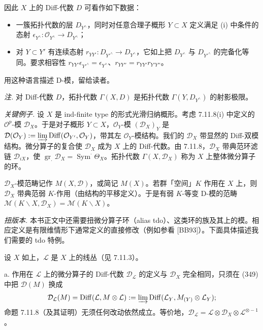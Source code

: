 因此 $X$ 上的 Diff-代数 $D$ 可看作如下数据：
\begin{itemize}[label=--]
\item 一簇拓扑代数的层 $D_{Y^\wedge}$，同时对任意合理子概形 $Y\subset X$ 定义满足 (i) 中条件的态射 $\epsilon_{Y^\wedge}:\mathcal{O}_{Y^\wedge}\to D_{Y^\wedge}$；
\item 对 $Y\subset Y'$ 有连续态射 $r_{YY'}:D_{Y'^\wedge}\to D_{Y^\wedge}$，它如上把 $D_{Y^\wedge}$ 与 $D_{Y'^\wedge}$ 的完备化等同。要求相容性 $r_{YY'}\epsilon_{Y'^\wedge}=\epsilon_{Y^\wedge}$、$r_{YY''}=r_{YY'}r_{Y'Y''}$。
\end{itemize}
用这种语言描述 D-模，留给读者。

\emph{注.} 对 Diff-代数 $D$，拓扑代数 $\Gamma(X,D)$ 是拓扑代数 $\Gamma(Y,D_{Y^\wedge})$ 的射影极限。

 \emph{关键例子.} 设 $X$ 是 ind-finite type 的形式光滑归纳概形。考虑 7.11.8(i) 中定义的 $\mathcal{O}^p$-模 $\mathcal{D}_X$。于是对子概形 $Y\subset X$，$\mathcal{O}_Y$-模 $(\mathcal{D}_X)_Y$ 是 $\mathcal{D}(\mathcal{O}_Y):=\varinjlim\operatorname{Diff}(\mathcal{O}_{Y'},\mathcal{O}_Y)$，带其左 $\mathcal{O}_Y$-模结构。我们的 $\mathcal{D}_X$ 带显然的 Diff-双模结构。微分算子的复合使 $\mathcal{D}_X$ 成为 $X$ 上的 Diff-代数。由 7.11.8，$\mathcal{D}_X$ 带典范环滤链 $\mathcal{D}_{iX}$，使 $\operatorname{gr}_\cdot\mathcal{D}_X=\operatorname{Sym}^\cdot\Theta_X$。拓扑代数 $\Gamma(X,\mathcal{D}_X)$ 称为 $X$ 上整体微分算子的环。

$\mathcal{D}_X$-模范畴记作 $M(X,\mathcal{D})$，或简记 $M(X)$。若群「空间」$K$ 作用在 $X$ 上，则 $\mathcal{D}_X$ 带典范弱 $K$-作用（由结构的平移定义）。于是有弱 $K$-等变 D-模的范畴 $\mathcal{M}(K\backslash X,\mathcal{D}_X)=\mathcal{M}(K\backslash X)$。

\emph{扭版本.} 本书正文中还需要扭微分算子环（alias tdo）、这类环的族及其上的模。相应定义是有限维情形下通常定义的直接修改（例如参看 [BB93]）。下面具体描述我们需要的 tdo 特例。

设 $X$ 如上，$\mathcal{L}$ 是 $X$ 上的线丛（见 7.11.3）。

a. 作用在 $\mathcal{L}$ 上的微分算子的 Diff-代数 $\mathcal{D}_{\mathcal{L}}$ 的定义与 $\mathcal{D}_X$ 完全相同，只须在 (349) 中把 $\mathcal{D}(M)$ 换成
\[
\mathcal{D}_{\mathcal{L}}(M)=\operatorname{Diff}(\mathcal{L},M\otimes\mathcal{L}):=\varinjlim\operatorname{Diff}(\mathcal{L}_Y,M_{(Y)}\otimes\mathcal{L}_Y);
\]
命题 7.11.8（及其证明）无须任何改动依然成立。等价地，$\mathcal{D}_{\mathcal{L}}=\mathcal{L}\otimes\mathcal{D}_X\otimes\mathcal{L}^{\otimes-1}$。

